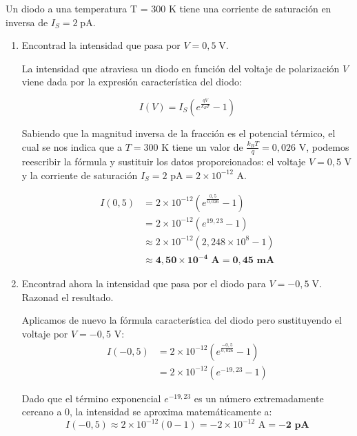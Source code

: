 \documentclass[11pt, a4paper]{article}
\newenvironment{problem}[1][Cuestión]{
	\vspace{0.5cm}
	\noindent{\Large\bfseries #1} \par\vspace{0.5cm}
}{
	\vspace{0.5cm}
}
\begin{document}
	\begin{problem}[Cuestión 8]
		Un diodo a una temperatura T = 300 K tiene una corriente de saturación en inversa de $I_S = 2 \; \text{pA}$.

		\begin{enumerate}[label=\alph*)] 
			\item Encontrad la intensidad que pasa por $V = 0,5 \; \text{V}$.

				{ \color{blue} 
					La intensidad que atraviesa un diodo en función del voltaje de polarización $V$ viene dada por la expresión característica del diodo:

					\begin{equation*}
						I(V) = I_S \left( e^{\frac{qV}{k_B T}} - 1 \right)
					\end{equation*}

					Sabiendo que la magnitud inversa de la fracción es el potencial térmico, el cual se nos indica que a $T = 300 \text{ K}$ tiene un valor de $\frac{k_B T}{q} = 0,026 \text{ V}$, podemos reescribir la fórmula y sustituir los datos proporcionados: el voltaje $V = 0,5 \text{ V}$ y la corriente de saturación $I_S = 2 \text{ pA} = 2 \times 10^{-12} \text{ A}$.

					\begin{align*}
						I(0,5) &= 2 \times 10^{-12} \left( e^{\frac{0,5}{0,026}} - 1 \right) \\
						&= 2 \times 10^{-12} \left( e^{19,23} - 1 \right) \\
						&\approx 2 \times 10^{-12} \left( 2,248 \times 10^8 - 1 \right) \\
						&\approx \mathbf{4,50 \times 10^{-4} \text{ A}} = \mathbf{0,45 \text{ mA}}
					\end{align*}
				}

			\item Encontrad ahora la intensidad que pasa por el diodo para $V = -0,5 \; \text{V}$. Razonad el resultado.

				{ \color{blue} 
					Aplicamos de nuevo la fórmula característica del diodo pero sustituyendo el voltaje por $V = -0,5 \text{ V}$:
					\begin{align*}
						I(-0,5) &= 2 \times 10^{-12} \left( e^{\frac{-0,5}{0,026}} - 1 \right) \\
						&= 2 \times 10^{-12} \left( e^{-19,23} - 1 \right)
					\end{align*}

					Dado que el término exponencial $e^{-19,23}$ es un número extremadamente cercano a $0$, la intensidad se aproxima matemáticamente a:
					\begin{equation*}
						I(-0,5) \approx 2 \times 10^{-12} \left( 0 - 1 \right) = -2 \times 10^{-12} \text{ A} = \mathbf{-2 \textbf{ pA}}
					\end{equation*}

}
\end{enumerate}
\end{problem}
\end{document}
